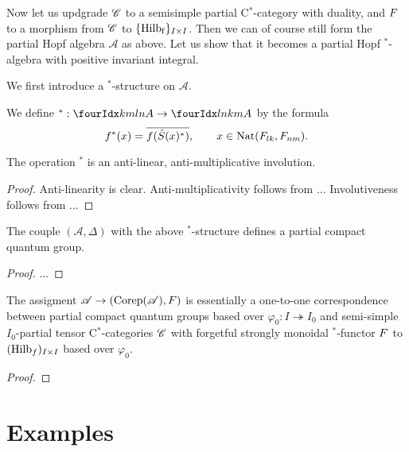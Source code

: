 Now let us updgrade $\mathscr{C}$ to a semisimple partial C$^*$-category with duality, and $F$ to a morphism from $\mathscr{C}$ to $\{\mathrm{Hilb}_{\operatorname{\mathrm{f}}}\}_{I\times I}$. Then we can of course still form the partial Hopf algebra $\mathscr{A}$ as above. Let us show that it becomes a partial Hopf $^*$-algebra with positive invariant integral.

We first introduce a $^*$-structure on $\mathscr{A}$. 

\begin{Def} We define $^*: \Gr{A}{k}{l}{m}{n}\rightarrow \Gr{A}{l}{k}{n}{m}$ by the formula \[f^*(x) = \overline{f(\hat{S}(x)^*)},\qquad x\in \operatorname{\mathrm{Nat}}(F_{lk},F_{nm}).\]
\end{Def}

\begin{Lem} The operation $^*$ is an anti-linear, anti-multiplicative involution.
\end{Lem}

\begin{proof} Anti-linearity is clear. Anti-multiplicativity follows from ... Involutiveness follows from ...

\end{proof}

\begin{Prop} The couple $(\mathscr{A},\Delta)$ with the above $^*$-structure defines a partial compact quantum group.
\end{Prop}
\begin{proof} ...

\end{proof} 

\begin{Theorem} \label{TheoTKPCQG} The assigment $\mathscr{A}\rightarrow (\mathrm{Corep}(\mathscr{A}),F)$ is essentially a one-to-one correspondence between partial compact quantum groups based over $\varphi_0:I\twoheadrightarrow I_0$ and semi-simple $I_0$-partial tensor C$^*$-categories $\mathscr{C}$ with forgetful strongly monoidal $^*$-functor $F$ to $(\mathrm{Hilb}_f)_{I\times I}$ based over $\varphi_0$.
\end{Theorem} 

\begin{proof}

\end{proof}

\section{Examples}

